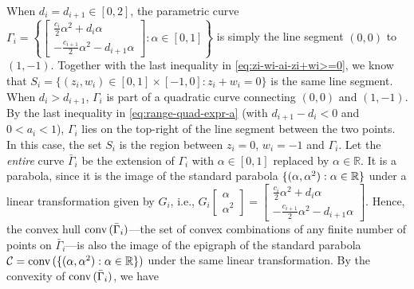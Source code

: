 	When $d_i = d_{i+1} \in [0,2]$, the parametric curve
	$\Gamma_i = \left\{ \left[\begin{smallmatrix}
		\frac{c_i}{2} \alpha^2 + d_i \alpha \\
		-\frac{c_{i+1}}{2} \alpha^2 - d_{i+1} \alpha
	\end{smallmatrix}\right]: \alpha \in [0,1] \right\}$
	is simply the line segment $(0,0)$ to $(1,-1)$. Together with the last inequality in \eqref{eq:zi-wi-ai-zi+wi>=0}, we know that
	$ S_i = \{ (z_i, w_i)\in [0,1]\times [-1, 0]: z_i + w_i = 0 \}$
	is the same line segment.
	When $d_i > d_{i+1}$, $\Gamma_i$ is part of a quadratic curve connecting $(0,0)$ and $(1,-1)$.
	By the last inequality in \eqref{eq:range-quad-expr-a} (with $d_{i+1} - d_i < 0$ and $0<a_i<1$), $\Gamma_i$ lies on the top-right of the line segment between the two points.
	In this case, the set $S_i$ is the region between $z_i = 0$, $w_i =-1$ and $\Gamma_i$. 
	Let the \emph{entire} curve $\bar{\Gamma}_i$ be the extension of $\Gamma_i$ with $\alpha\in [0,1]$ replaced by $\alpha \in \mathbb{R}$.	
	It is a parabola, since it is the image of the standard parabola $\{ (\alpha, \alpha^2): \alpha\in \mathbb{R} \}$ under a linear transformation given by $G_i$, i.e., $G_i \left[\begin{smallmatrix}
		\alpha \\ \alpha^2
	\end{smallmatrix}\right] = \left[\begin{smallmatrix}
		\frac{c_i}{2} \alpha^2 + d_i \alpha \\
		-\frac{c_{i+1}}{2}\alpha^2 - d_{i+1} \alpha
	\end{smallmatrix}\right]$.
	Hence, the convex hull $\textnormal{conv}\,(\bar{\Gamma}_i)$---the set of convex combinations of any finite number of points on $\bar{\Gamma}_i$---is also the image of the epigraph of the standard parabola $\mathcal{C}=\textnormal{conv}\,(\{ (\alpha, \alpha^2):\alpha\in \mathbb{R} \})$ under the same linear transformation. By the convexity of $\textnormal{conv}\,(\bar{\Gamma}_i)$, we have
